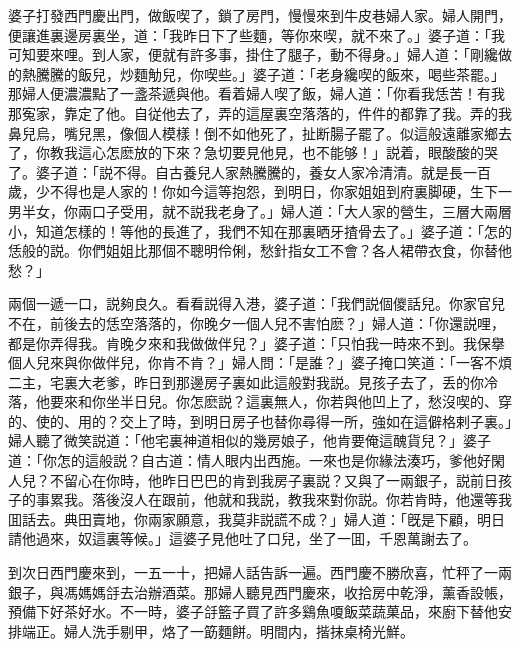 婆子打發西門慶出門，做飯喫了，鎖了房門，慢慢來到牛皮巷婦人家。婦人開門，便讓進裏邊房裏坐，道：「我昨日下了些麵，等你來喫，就不來了。」婆子道：「我可知要來哩。到人家，便就有許多事，掛住了腿子，動不得身。」婦人道：「剛纔做的熱騰騰的飯兒，炒麵觔兒，你喫些。」婆子道：「老身纔喫的飯來，喝些茶罷。」那婦人便濃濃點了一盞茶遞與他。看着婦人喫了飯，婦人道：「你看我恁苦！有我那寃家，靠定了他。自従他去了，弄的這屋裏空落落的，件件的都靠了我。弄的我鼻兒烏，嘴兒黑，像個人模樣！倒不如他死了，扯断腸子罷了。似這般遠離家鄉去了，你教我這心怎麽放的下來？急切要見他見，也不能够！」説着，眼酸酸的哭了。婆子道：「説不得。自古養兒人家熱騰騰的，養女人家冷清清。就是長一百歲，少不得也是人家的！你如今這等抱怨，到明日，你家姐姐到府裏脚硬，生下一男半女，你兩口子受用，就不説我老身了。」婦人道：「大人家的營生，三層大兩層小，知道怎樣的！等他的長進了，我們不知在那裏晒牙揸骨去了。」婆子道：「怎的恁般的説。你們姐姐比那個不聰明伶俐，愁針指女工不會？各人裙帶衣食，你替他愁？」

兩個一遞一口，説夠良久。看看説得入港，婆子道：「我們説個儍話兒。你家官兒不在，前後去的恁空落落的，你晚夕一個人兒不害怕麽？」婦人道：「你還説哩，都是你弄得我。肯晚夕來和我做做伴兒？」婆子道：「只怕我一時來不到。我保擧個人兒來與你做伴兒，你肯不肯？」婦人問：「是誰？」婆子掩口笑道：「一客不煩二主，宅裏大老爹，昨日到那邊房子裏如此這般對我説。見孩子去了，丢的你冷落，他要來和你坐半日兒。你怎麽説？這裏無人，你若與他凹上了，愁沒喫的、穿的、使的、用的？交上了時，到明日房子也替你尋得一所，強如在這僻格剌子裏。」婦人聽了微笑説道：「他宅裏神道相似的幾房娘子，他肯要俺這醜貨兒？」婆子道：「你怎的這般説？自古道：情人眼内出西施。一來也是你緣法湊巧，爹他好閑人兒？不留心在你時，他昨日巴巴的肯到我房子裏説？又與了一兩銀子，説前日孩子的事累我。落後沒人在跟前，他就和我説，教我來對你説。你若肯時，他還等我囬話去。典田賣地，你兩家願意，我莫非説謊不成？」婦人道：「旣是下顧，明日請他過來，奴這裏等候。」這婆子見他吐了口兒，坐了一囬，千恩萬謝去了。

到次日西門慶來到，一五一十，把婦人話告訴一遍。西門慶不勝欣喜，忙秤了一兩銀子，與馮媽媽㧱去治辦酒菜。那婦人聽見西門慶來，收拾房中乾淨，薰香設帳，預備下好茶好水。不一時，婆子㧱籃子買了許多鷄魚嗄飯菜蔬菓品，來廚下替他安排端正。婦人洗手剔甲，烙了一筯麵餅。明間内，揩抹桌椅光鮮。

